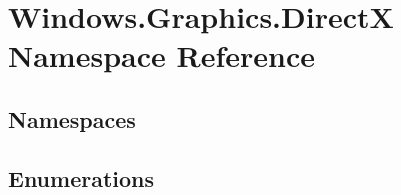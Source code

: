 \hypertarget{namespace_windows_1_1_graphics_1_1_direct_x}{}\section{Windows.\+Graphics.\+DirectX Namespace Reference}
\label{namespace_windows_1_1_graphics_1_1_direct_x}
\subsection*{Namespaces}
\begin{DoxyCompactItemize}
\end{DoxyCompactItemize}
\subsection*{Enumerations}
